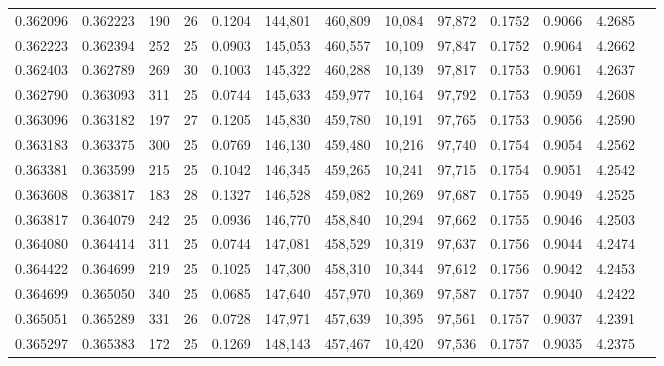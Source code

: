 \begin{tabular}{rrrrrrrrrrrrr}
0.362096 & 0.362223 & 190 &  26 &                                     0.1204 & 144,801 & 460,809 &  10,084 &  97,872 & 0.1752 & 0.9066 & 4.2685 \\
0.362223 & 0.362394 & 252 &  25 &                                     0.0903 & 145,053 & 460,557 &  10,109 &  97,847 & 0.1752 & 0.9064 & 4.2662 \\
0.362403 & 0.362789 & 269 &  30 &                                     0.1003 & 145,322 & 460,288 &  10,139 &  97,817 & 0.1753 & 0.9061 & 4.2637 \\
0.362790 & 0.363093 & 311 &  25 &                                     0.0744 & 145,633 & 459,977 &  10,164 &  97,792 & 0.1753 & 0.9059 & 4.2608 \\
0.363096 & 0.363182 & 197 &  27 &                                     0.1205 & 145,830 & 459,780 &  10,191 &  97,765 & 0.1753 & 0.9056 & 4.2590 \\
0.363183 & 0.363375 & 300 &  25 &                                     0.0769 & 146,130 & 459,480 &  10,216 &  97,740 & 0.1754 & 0.9054 & 4.2562 \\
0.363381 & 0.363599 & 215 &  25 &                                     0.1042 & 146,345 & 459,265 &  10,241 &  97,715 & 0.1754 & 0.9051 & 4.2542 \\
0.363608 & 0.363817 & 183 &  28 &                                     0.1327 & 146,528 & 459,082 &  10,269 &  97,687 & 0.1755 & 0.9049 & 4.2525 \\
0.363817 & 0.364079 & 242 &  25 &                                     0.0936 & 146,770 & 458,840 &  10,294 &  97,662 & 0.1755 & 0.9046 & 4.2503 \\
0.364080 & 0.364414 & 311 &  25 &                                     0.0744 & 147,081 & 458,529 &  10,319 &  97,637 & 0.1756 & 0.9044 & 4.2474 \\
0.364422 & 0.364699 & 219 &  25 &                                     0.1025 & 147,300 & 458,310 &  10,344 &  97,612 & 0.1756 & 0.9042 & 4.2453 \\
0.364699 & 0.365050 & 340 &  25 &                                     0.0685 & 147,640 & 457,970 &  10,369 &  97,587 & 0.1757 & 0.9040 & 4.2422 \\
0.365051 & 0.365289 & 331 &  26 &                                     0.0728 & 147,971 & 457,639 &  10,395 &  97,561 & 0.1757 & 0.9037 & 4.2391 \\
0.365297 & 0.365383 & 172 &  25 &                                     0.1269 & 148,143 & 457,467 &  10,420 &  97,536 & 0.1757 & 0.9035 & 4.2375 \\

\end{tabular}
